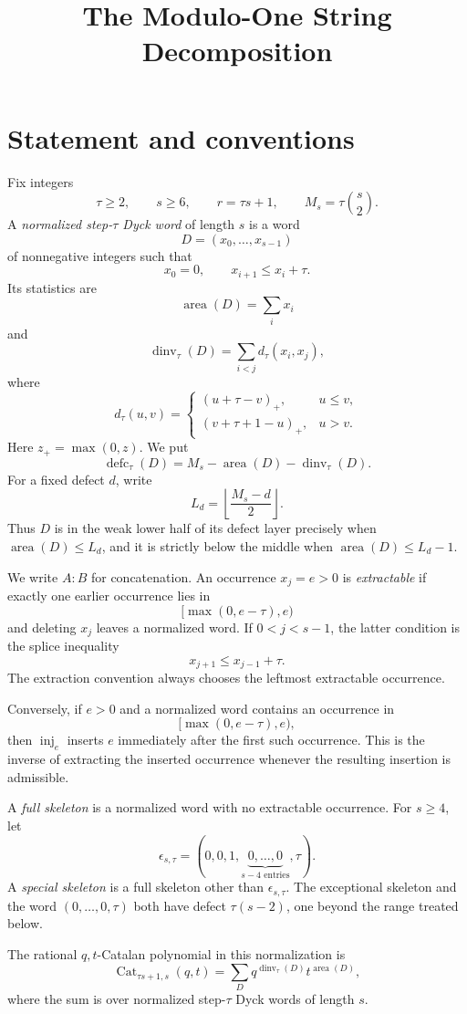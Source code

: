 \documentclass[11pt]{article}
\title{The Modulo-One String Decomposition}
\author{}
\date{}
\theoremstyle{definition}
\theoremstyle{remark}
\newcommand{\area}{\operatorname{area}}
\newcommand{\dinv}{\operatorname{dinv}}
\newcommand{\defc}{\operatorname{defc}}
\newcommand{\inj}{\operatorname{inj}}
\newcommand{\Cat}{\operatorname{Cat}}
\begin{document}
\maketitle

\section{Statement and conventions}

Fix integers
\[
  \tau\ge2,
  \qquad s\ge6,
  \qquad r=\tau s+1,
  \qquad M_s=\tau\binom{s}{2}.
\]
A \emph{normalized step-$\tau$ Dyck word} of length $s$ is a word
\[
  D=(x_0,\ldots,x_{s-1})
\]
of nonnegative integers such that
\[
  x_0=0,
  \qquad x_{i+1}\le x_i+\tau.
\]
Its statistics are
\[
  \area(D)=\sum_i x_i
\]
and
\[
  \dinv_\tau(D)=\sum_{i<j}d_\tau(x_i,x_j),
\]
where
\[
 d_\tau(u,v)=
 \begin{cases}
   (u+\tau-v)_+,&u\le v,\\
   (v+\tau+1-u)_+,&u>v.
 \end{cases}
\]
Here $z_+=\max(0,z)$.  We put
\[
  \defc_\tau(D)=M_s-\area(D)-\dinv_\tau(D).
\]
For a fixed defect $d$, write
\[
  L_d=\left\lfloor\frac{M_s-d}{2}\right\rfloor.
\]
Thus $D$ is in the weak lower half of its defect layer precisely when
$\area(D)\le L_d$, and it is strictly below the middle when
$\area(D)\le L_d-1$.

We write $A:B$ for concatenation.  An occurrence $x_j=e>0$ is
\emph{extractable} if exactly one earlier occurrence lies in
\[
  [\max(0,e-\tau),e)
\]
and deleting $x_j$ leaves a normalized word.  If $0<j<s-1$, the latter
condition is the splice inequality
\[
  x_{j+1}\le x_{j-1}+\tau.
\]
The extraction convention always chooses the leftmost extractable
occurrence.

Conversely, if $e>0$ and a normalized word contains an occurrence in
\[
  [\max(0,e-\tau),e),
\]
then $\inj_e$ inserts $e$ immediately after the first such occurrence.
This is the inverse of extracting the inserted occurrence whenever the
resulting insertion is admissible.

A \emph{full skeleton} is a normalized word with no extractable occurrence.
For $s\ge4$, let
\[
  \epsilon_{s,\tau}
  =(0,0,1,\underbrace{0,\ldots,0}_{s-4\text{ entries}},\tau).
\]
A \emph{special skeleton} is a full skeleton other than
$\epsilon_{s,\tau}$.  The exceptional skeleton and the word
$(0,\ldots,0,\tau)$ both have defect $\tau(s-2)$, one beyond the range
treated below.

The rational $q,t$-Catalan polynomial in this normalization is
\[
  \Cat_{\tau s+1,s}(q,t)
  =\sum_D q^{\dinv_\tau(D)}t^{\area(D)},
\]
where the sum is over normalized step-$\tau$ Dyck words of length $s$.
\end{document}

